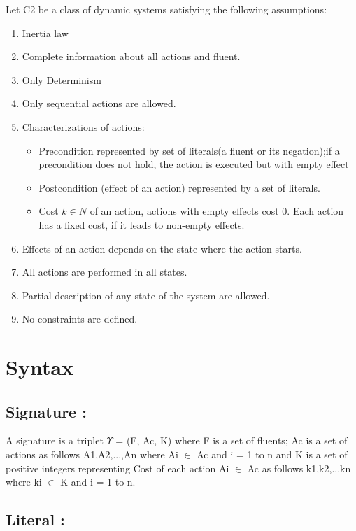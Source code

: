 \documentclass[11pt]{article}
\begin{document}
	Let C2 be a class of dynamic systems satisfying the following assumptions:
	\begin{enumerate}
		\item Inertia law
		\item Complete information about all actions and fluent. 
		\item Only Determinism
		\item Only sequential actions are allowed.
		\item Characterizations of actions:\begin{itemize}
			\item Precondition represented by set of literals(a fluent or its negation);if a precondition does not hold, the action is executed but with empty effect
			\item Postcondition (effect of an action) represented by a set of literals.
			\item Cost $k \in N $ of an action, actions with empty effects cost 0. Each action has a fixed cost, if it leads to non-empty effects. 
		\end{itemize}
		\item Effects of an action depends on the state where the action starts.
		\item All actions are performed in all states.
		\item Partial description of any state of the system are allowed.
		\item No constraints are defined.	 
	\end{enumerate}
	
	\section{Syntax}\label{sec:syntax}
	
	
	\subsection{Signature :}\label{sec:Signature} 

A signature is a triplet $\Upsilon$ = (F, Ac, K) where F is a set of fluents; Ac is a set of actions as follows A1,A2,...,An where Ai $\in$ Ac and i = 1 to n and K is a set of positive integers representing Cost of each action Ai $\in$ Ac as follows k1,k2,...kn where ki $\in$ K and i = 1 to n.

\subsection{Literal :}\label{sec:Literal} 
\end{document}
